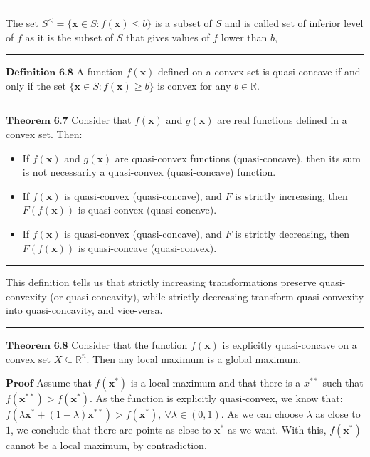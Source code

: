 \documentclass[0pt, a4paper]{article}
\begin{document}
\noindent\rule{\textwidth}{1pt}

The set $S^\leq=\{\textbf{x}\in S: f(\textbf{x})\leq b\}$ is a subset of $S$ and is called set of inferior level of $f$ as it is the subset of $S$ that gives values of $f$ lower than $b$,
 
\noindent\rule{\textwidth}{1pt}
 
$\textbf{Definition 6.8}$ A function $f(\textbf{x})$ defined on a convex set is quasi-concave if and only if the set $\{\textbf{x}\in S: f(\textbf{x})\geq b\}$ is convex for any $b\in\mathbb{R}$.


\noindent\rule{\textwidth}{1pt}

$\textbf{Theorem 6.7}$ Consider that $f(\textbf{x})$ and $g(\textbf{x})$ are real functions defined in a convex set. Then:
\begin{itemize}
	\item If $f(\textbf{x})$ and $g(\textbf{x})$ are quasi-convex functions (quasi-concave), then its sum is not necessarily a quasi-convex (quasi-concave) function.
	\item If $f(\textbf{x})$ is quasi-convex (quasi-concave), and $F$ is strictly increasing, then $F(f(\textbf{x}))$ is quasi-convex (quasi-concave).
	\item If $f(\textbf{x})$ is quasi-convex (quasi-concave), and $F$ is strictly decreasing, then $F(f(\textbf{x}))$ is quasi-concave (quasi-convex).
\end{itemize}

\noindent\rule{\textwidth}{1pt}

This definition tells us that strictly increasing transformations preserve quasi-convexity (or quasi-concavity), while strictly decreasing transform quasi-convexity into quasi-concavity, and vice-versa.

\noindent\rule{\textwidth}{1pt}

$\textbf{Theorem 6.8}$ Consider that the function $f(\textbf{x})$ is explicitly quasi-concave on a convex set $X\subseteq\mathbb{R}^n$. Then any local maximum is a global maximum.
 
 $\textbf{Proof}$ Assume that $f(\textbf{x}^*)$ is a local maximum and that there is a $x^{**}$ such that $f(\textbf{x}^{**})>f(\textbf{x}^{*})$. As the function is explicitly quasi-convex, we know that: $f(\lambda\textbf{x}^*+(1-\lambda)\textbf{x}^{**})>f(\textbf{x}^*),\ \forall\lambda\in(0,1)$. As we can choose $\lambda$ as close to $1$, we conclude that there are points as close to $\textbf{x}^*$ as we want. With this, $f(\textbf{x}^*)$ cannot be a local maximum, by contradiction.
 
\end{document}
